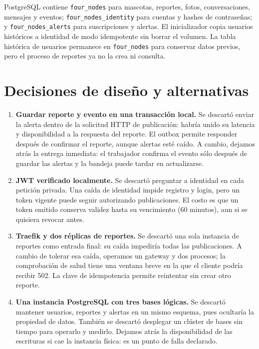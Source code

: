 \documentclass[11pt,letterpaper]{article}
\begin{document}
PostgreSQL contiene \texttt{four\_nodes} para mascotas, reportes, fotos, conversaciones, mensajes y eventos; \texttt{four\_nodes\_identity} para cuentas y hashes de contraseñas; y \texttt{four\_nodes\_alerts} para suscripciones y alertas. El inicializador copia usuarios históricos a identidad de modo idempotente sin borrar el volumen. La tabla histórica de usuarios permanece en \texttt{four\_nodes} para conservar datos previos, pero el proceso de reportes ya no la crea ni consulta.

\section{Decisiones de diseño y alternativas}
\begin{enumerate}[leftmargin=*]
\item \textbf{Guardar reporte y evento en una transacción local.} Se descartó enviar la alerta dentro de la solicitud HTTP de publicación: habría unido su latencia y disponibilidad a la respuesta del reporte. El outbox permite responder después de confirmar el reporte, aunque alertas esté caído. A cambio, dejamos atrás la entrega inmediata: el trabajador confirma el evento sólo después de guardar las alertas y la bandeja puede tardar en actualizarse.
\item \textbf{JWT verificado localmente.} Se descartó preguntar a identidad en cada petición privada. Una caída de identidad impide registro y login, pero un token vigente puede seguir autorizando publicaciones. El costo es que un token emitido conserva validez hasta su vencimiento (60 minutos), aun si se quisiera revocar antes.
\item \textbf{Traefik y dos réplicas de reportes.} Se descartó una sola instancia de reportes como entrada final: su caída impediría todas las publicaciones. A cambio de tolerar esa caída, operamos un gateway y dos procesos; la comprobación de salud tiene una ventana breve en la que el cliente podría recibir 502. La clave de idempotencia permite reintentar sin crear otro reporte.
\item \textbf{Una instancia PostgreSQL con tres bases lógicas.} Se descartó mantener usuarios, reportes y alertas en un mismo esquema, pues ocultaría la propiedad de datos. También se descartó desplegar un clúster de bases sin tiempo para operarlo y medirlo. Dejamos atrás la disponibilidad de las escrituras si cae la instancia física: es un punto de falla declarado.
\end{enumerate}
\end{document}
